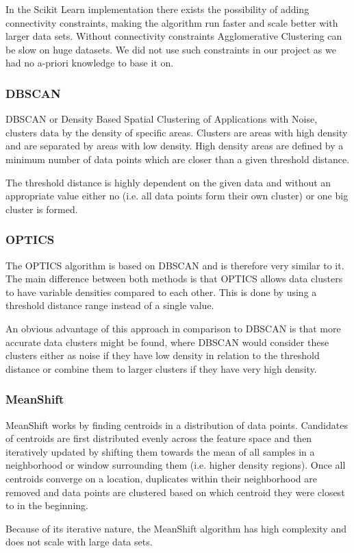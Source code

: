 In the Scikit Learn implementation there exists the possibility of adding connectivity constraints, making the algorithm run faster and scale better with larger data sets. Without connectivity constraints Agglomerative Clustering can be slow on huge datasets. We did not use such constraints in our project as we had no a-priori knowledge to base it on.

\subsubsection{DBSCAN}
\label{subsubsec:dbscan}
DBSCAN or Density Based Spatial Clustering of Applications with Noise, clusters data by the density of specific areas. Clusters are areas with high density and are separated by areas with low density. High density areas are defined by a minimum number of data points which are closer than a given threshold distance.\cite{dbscan_paper}

The threshold distance is highly dependent on the given data and without an appropriate value either no (i.e. all data points form their own cluster) or one big cluster is formed.

\subsubsection{OPTICS}
The OPTICS algorithm is based on DBSCAN and is therefore very similar to it. The main difference between both methods is that OPTICS allows data clusters to have variable densities compared to each other. This is done by using a threshold distance range instead of a single value.\cite{optics_paper}

An obvious advantage of this approach in comparison to DBSCAN is that more accurate data clusters might be found, where DBSCAN would consider these clusters either as noise if they have low density in relation to the threshold distance or combine them to larger clusters if they have very high density.

\subsubsection{MeanShift}
MeanShift works by finding centroids in a distribution of data points. Candidates of centroids are first distributed evenly across the feature space and then iteratively updated by shifting them towards the mean of all samples in a neighborhood or window surrounding them (i.e. higher density regions). Once all centroids converge on a location, duplicates within their neighborhood are removed and data points are clustered based on which centroid they were closest to in the beginning.\cite{seif_2021}

Because of its iterative nature, the MeanShift algorithm has high complexity and does not scale with large data sets.